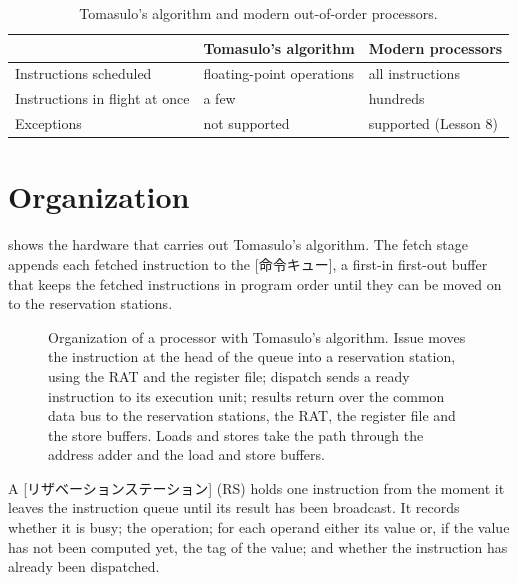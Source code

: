 \documentclass[../main.tex]{subfiles}
\begin{document}
\begin{table}[htbp]
  \centering\small
  \caption{Tomasulo's algorithm and modern out-of-order processors.}
  \label{tab:l07-modern}
  \begin{tabular}{@{}lll@{}}
    \toprule
    & Tomasulo's algorithm & Modern processors \\
    \midrule
    Instructions scheduled         & floating-point operations & all instructions \\
    Instructions in flight at once & a few                     & hundreds \\
    Exceptions                     & not supported             & supported (Lesson 8) \\
    \bottomrule
  \end{tabular}
\end{table}

\section{Organization}
\label{sec:l07-organization}

 shows the hardware that carries out Tomasulo's
algorithm.  The fetch stage appends
each fetched instruction to the [命令キュー], a
first-in first-out buffer that keeps the fetched instructions in program
order until they can be moved on to the reservation stations.

\begin{figure}[htbp]
  \centering
  
  \caption{Organization of a processor with Tomasulo's algorithm.  Issue moves
    the instruction at the head of the queue into a reservation station, using
    the RAT and the register file; dispatch sends a ready instruction to its
    execution unit; results return over the common data bus to the
    reservation stations, the RAT, the register file and the store buffers.
    Loads and stores take the path through the address adder and the load
    and store buffers.}
  \label{fig:l07-tomasulo}
\end{figure}

\begin{definition}
  \label{def:l07-rs}
  A [リザベーションステーション]%
   (RS) holds one instruction from the
  moment it leaves the instruction queue until its result has been
  broadcast.  It records whether it is busy; the operation; for each operand
  either its value or, if the value has not been computed yet, the tag of the
  value; and whether the instruction has already been dispatched.
\end{definition}
\end{document}
